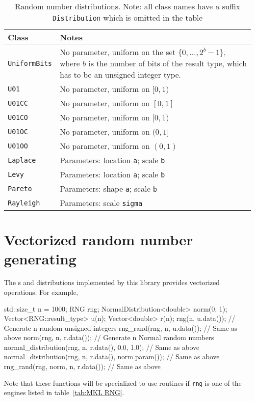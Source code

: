 \begin{table}
  \begin{tabularx}{\textwidth}{lX}
    \toprule
    Class & Notes \\
    \midrule
    \verb|UniformBits|
    & No parameter, uniform on the set $\{0,\dots,2^b - 1\}$, where $b$ is the
    number of bits of the result type, which has to be an unsigned integer
    type. \\
    \verb|U01|      & No parameter, uniform on $[0, 1)$                 \\
    \verb|U01CC|    & No parameter, uniform on $[0, 1]$                 \\
    \verb|U01CO|    & No parameter, uniform on $[0, 1)$                 \\
    \verb|U01OC|    & No parameter, uniform on $(0, 1]$                 \\
    \verb|U01OO|    & No parameter, uniform on $(0, 1)$                 \\
    \verb|Laplace|  & Parameters: location \texttt{a}; scale \texttt{b} \\
    \verb|Levy|     & Parameters: location \texttt{a}; scale \texttt{b} \\
    \verb|Pareto|   & Parameters: shape \texttt{a}; scale \texttt{b}    \\
    \verb|Rayleigh| & Parameters: scale \texttt{sigma}                  \\
    \bottomrule
  \end{tabularx}
  \caption{Random number distributions. Note: all class names have a suffix
    \texttt{Distribution} which is omitted in the table}
  \label{tab:Random number distributions}
\end{table}

\section{Vectorized random number generating}
\label{sec:Vectorized random number generating}

The \rng{}s and distributions implemented by this library provides vectorized
operations. For example,
\begin{cppcode}
  std::size_t n = 1000;
  RNG rng;
  NormalDistribution<double> norm(0, 1);
  Vector<RNG::result_type> u(n);
  Vector<double> r(n);
  rng(n, u.data());           // Generate n random unsigned integers
  rng_rand(rng, n, u.data()); // Same as above
  norm(rng, n, r.data());     // Generate n Normal random numbers
  normal_distribution(rng, n, r.data(), 0.0, 1.0);     // Same as above
  normal_distribution(rng, n, r.data(), norm.param()); // Same as above
  rng_rand(rng, norm, n, r.data());                    // Same as above
\end{cppcode}
Note that these functions will be specialized to use \mkl routines if
\verb|rng| is one of the engines listed in table~\ref{tab:MKL RNG}.

